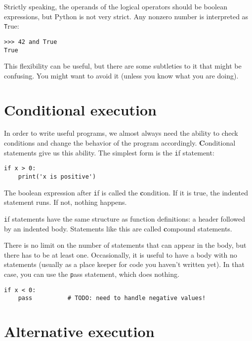 \documentclass[
DIV=11,
fontsize=13,
twoside,
headinclude=false,
titlepage=firstiscover,
abstract=true,
headsepline=true,
footsepline=true,
chapterprefix=true, %
headings=big,
bibliography=totoc,%
captions=tableheading
]{scrbook}
\theoremstyle{definition}
\begin{document}
Strictly speaking, the operands of the logical operators should be
boolean expressions, but Python is not very strict.
Any nonzero number is interpreted as {\texttt True}:

\begin{lstlisting}
>>> 42 and True
True
\end{lstlisting}
%
This flexibility can be useful, but there are some subtleties to
it that might be confusing.  You might want to avoid it (unless
you know what you are doing).


\section{Conditional execution}
\label{conditional.execution}

In order to write useful programs, we almost always need the ability
to check conditions and change the behavior of the program
accordingly.  {\textbf Conditional statements} give us this ability.  The
simplest form is the {\texttt if} statement:

\begin{lstlisting}
if x > 0:
    print('x is positive')
\end{lstlisting}
%
The boolean expression after {\texttt if} is
called the {\textbf condition}.  If it is true, the indented
statement runs.  If not, nothing happens.

{\texttt if} statements have the same structure as function definitions:
a header followed by an indented body.  Statements like this are
called {\textbf compound statements}.

There is no limit on the number of statements that can appear in
the body, but there has to be at least one.
Occasionally, it is useful to have a body with no statements (usually
as a place keeper for code you haven't written yet).  In that
case, you can use the {\texttt pass} statement, which does nothing.

\begin{lstlisting}
if x < 0:
    pass          # TODO: need to handle negative values!
\end{lstlisting}
%

\section{Alternative execution}
\label{alternative.execution}
\end{document}
